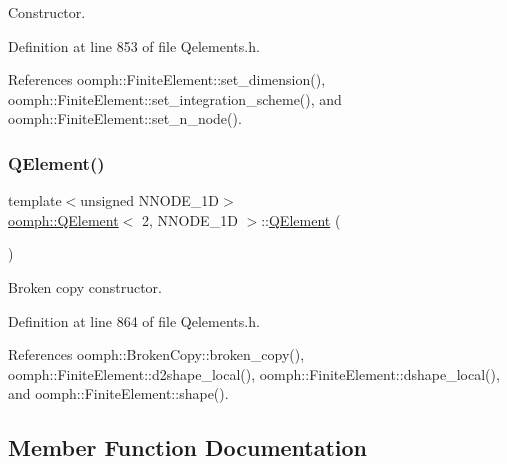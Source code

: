 Constructor. 



Definition at line 853 of file Qelements.\+h.



References oomph\+::\+Finite\+Element\+::set\+\_\+dimension(), oomph\+::\+Finite\+Element\+::set\+\_\+integration\+\_\+scheme(), and oomph\+::\+Finite\+Element\+::set\+\_\+n\+\_\+node().

\mbox{\label{classoomph_1_1QElement_3_012_00_01NNODE__1D_01_4_ac21098ab7cb665e297ca2c67a5517d02}} 
\subsubsection{\texorpdfstring{Q\+Element()}{QElement()}\hspace{0.1cm}{\footnotesize\ttfamily [2/2]}}
{\footnotesize\ttfamily template$<$unsigned N\+N\+O\+D\+E\+\_\+1D$>$ \\
\hyperlink{classoomph_1_1QElement}{oomph\+::\+Q\+Element}$<$ 2, N\+N\+O\+D\+E\+\_\+1D $>$\+::\hyperlink{classoomph_1_1QElement}{Q\+Element} (\begin{DoxyParamCaption}\item[{const \hyperlink{classoomph_1_1QElement}{Q\+Element}$<$ 2, N\+N\+O\+D\+E\+\_\+1D $>$ \&}]{ }\end{DoxyParamCaption})\hspace{0.3cm}{\ttfamily [inline]}}



Broken copy constructor. 



Definition at line 864 of file Qelements.\+h.



References oomph\+::\+Broken\+Copy\+::broken\+\_\+copy(), oomph\+::\+Finite\+Element\+::d2shape\+\_\+local(), oomph\+::\+Finite\+Element\+::dshape\+\_\+local(), and oomph\+::\+Finite\+Element\+::shape().



\subsection{Member Function Documentation}
\mbox{\label{classoomph_1_1QElement_3_012_00_01NNODE__1D_01_4_a705bcbb69709909c93299e1f7a7c39e8}} 
